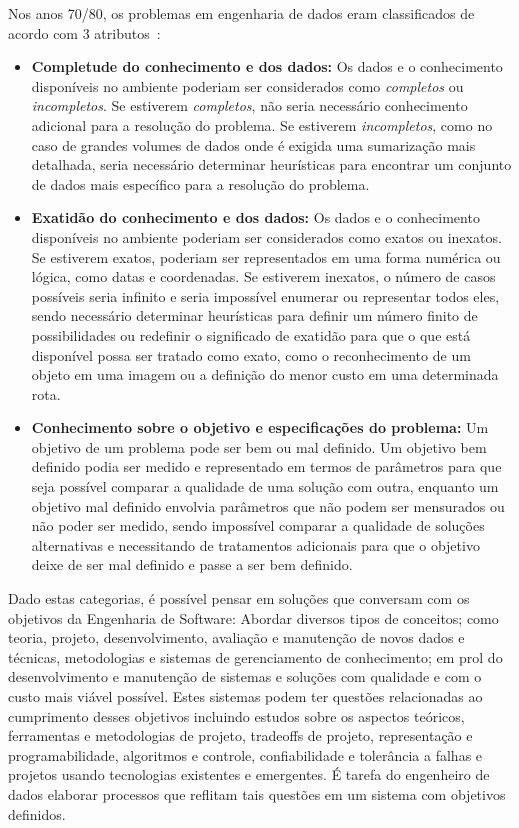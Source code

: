 \documentclass[Portugues,Final]{ic-tese-v3}
\begin{document}
Nos anos 70/80, os problemas em engenharia de dados eram classificados de acordo com 3 atributos~\cite{IEEE_1989}:

\begin{itemize}
\item \textbf{Completude do conhecimento e dos dados:} Os dados e o conhecimento disponíveis no ambiente poderiam ser considerados como \textit{completos} ou \textit{incompletos}. Se estiverem \textit{completos}, não seria necessário conhecimento adicional para a resolução do problema. Se estiverem \textit{incompletos}, como no caso de grandes volumes de dados onde é exigida uma sumarização mais detalhada, seria necessário determinar heurísticas para encontrar um conjunto de dados mais específico para a resolução do problema.
\item \textbf{Exatidão do conhecimento e dos dados:} Os dados e o conhecimento disponíveis no ambiente poderiam ser considerados como exatos ou inexatos. Se estiverem exatos, poderiam ser representados em uma forma numérica ou lógica, como datas e coordenadas. Se estiverem inexatos, o número de casos possíveis seria infinito e seria impossível enumerar ou representar todos eles, sendo necessário determinar heurísticas para definir um número finito de possibilidades ou redefinir o significado de exatidão para que o que está disponível possa ser tratado como exato, como o reconhecimento de um objeto em uma imagem ou a definição do menor custo em uma determinada rota.
\item \textbf{Conhecimento sobre o objetivo e especificações do problema:} Um objetivo de um problema pode ser bem ou mal definido. Um objetivo bem definido podia ser medido e representado em termos de parâmetros para que seja possível comparar a qualidade de uma solução com outra, enquanto um objetivo mal definido envolvia parâmetros que não podem ser mensurados ou não poder ser medido, sendo impossível comparar a qualidade de soluções alternativas e necessitando de tratamentos adicionais para que o objetivo deixe de ser mal definido e passe a ser bem definido. 
\end{itemize}

Dado estas categorias, é possível pensar em soluções que conversam com os objetivos da Engenharia de Software: Abordar diversos tipos de conceitos; como teoria, projeto, desenvolvimento, avaliação e manutenção de novos dados e técnicas, metodologias e sistemas de gerenciamento de conhecimento; em prol do desenvolvimento e manutenção de sistemas e soluções com qualidade e com o custo mais viável possível. Estes sistemas podem ter questões relacionadas ao cumprimento desses objetivos incluindo estudos sobre os aspectos teóricos, ferramentas e metodologias de projeto, tradeoffs de projeto, representação e programabilidade, algoritmos e controle, confiabilidade e tolerância a falhas e projetos usando tecnologias existentes e emergentes. É tarefa do engenheiro de dados elaborar processos que reflitam tais questões em um sistema com objetivos definidos.
\end{document}
